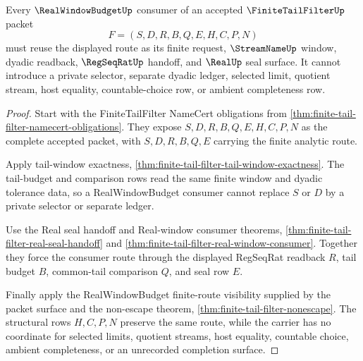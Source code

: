 \begin{theorem}
\label{thm:finitetailfilter-realwindowbudget-consumer-link}
Every $\RealWindowBudgetUp$ consumer of an accepted $\FiniteTailFilterUp$ packet
$$
F=(S,D,R,B,Q,E,H,C,P,N)
$$
must reuse the displayed route as its finite request, $\StreamNameUp$ window, dyadic readback, $\RegSeqRatUp$ handoff, and $\RealUp$ seal surface. It cannot introduce a private selector, separate dyadic ledger, selected limit, quotient stream, host equality, countable-choice row, or ambient completeness row.
\end{theorem}
\begin{proof}
Start with the FiniteTailFilter NameCert obligations from \autoref{thm:finite-tail-filter-namecert-obligations}. They expose $S,D,R,B,Q,E,H,C,P,N$ as the complete accepted packet, with $S,D,R,B,Q,E$ carrying the finite analytic route.

Apply tail-window exactness, \autoref{thm:finite-tail-filter-tail-window-exactness}. The tail-budget and comparison rows read the same finite window and dyadic tolerance data, so a RealWindowBudget consumer cannot replace $S$ or $D$ by a private selector or separate ledger.

Use the Real seal handoff and Real-window consumer theorems, \autoref{thm:finite-tail-filter-real-seal-handoff} and \autoref{thm:finite-tail-filter-real-window-consumer}. Together they force the consumer route through the displayed RegSeqRat readback $R$, tail budget $B$, common-tail comparison $Q$, and seal row $E$.

Finally apply the RealWindowBudget finite-route visibility supplied by the packet surface and the non-escape theorem, \autoref{thm:finite-tail-filter-nonescape}. The structural rows $H,C,P,N$ preserve the same route, while the carrier has no coordinate for selected limits, quotient streams, host equality, countable choice, ambient completeness, or an unrecorded completion surface.
\end{proof}


